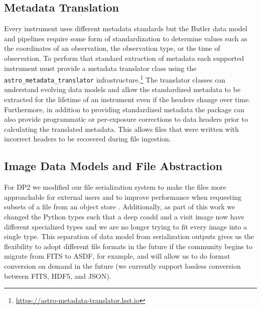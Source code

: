 \subsection{Metadata Translation}

Every instrument uses different metadata standards but the Butler data model and pipelines require some form of standardization to determine values such as the coordinates of an observation, the observation type, or the time of observation.
To perform that standard extraction of metadata each supported instrument must provide a metadata translator class using the \texttt{astro\_metadata\_translator} infrastructure.\footnote{\url{https://astro-metadata-translator.lsst.io}}
The translator classes can understand evolving data models and allow the standardized metadata to be extracted for the lifetime of an instrument even if the headers change over time.
Furthermore, in addition to providing standardized metadata the package can also provide programmatic or per-exposure corrections to data headers prior to calculating the translated metadata.
This allows files that were written with incorrect headers to be recovered during file ingestion.

\subsection{Image Data Models and File Abstraction}

For DP2 we modified our file serialization system to make the files more approachable for external users and to improve performance when requesting subsets of a file from an object store \citep{2026SPIE14155E..17B}.
Additionally, as part of this work we changed the Python types such that a deep coadd and a visit image now have different specialized types and we are no longer trying to fit every image into a single type.
This separation of data model from serialization outputs gives us the flexibility to adopt different file formats in the future if the community begins to migrate from FITS to ASDF, for example, and will allow us to do format conversion on demand in the future (we currently support lossless conversion between FITS, HDF5, and JSON).
